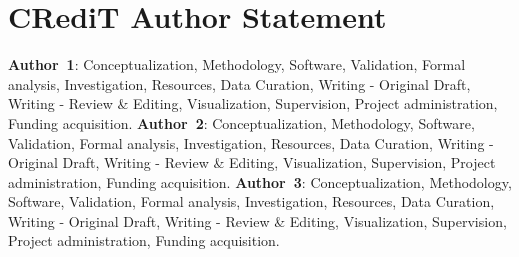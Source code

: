 \documentclass[../main.tex]{subfiles}
\begin{document}
    \clearpage
\section*{CRediT Author Statement}
    \label{section:credit-author}

\textbf{Author~1}: Conceptualization, Methodology, Software, Validation, Formal analysis, Investigation, Resources, Data Curation, Writing - Original Draft, Writing - Review \& Editing, Visualization, Supervision, Project administration, Funding acquisition.
\textbf{Author~2}: Conceptualization, Methodology, Software, Validation, Formal analysis, Investigation, Resources, Data Curation, Writing - Original Draft, Writing - Review \& Editing, Visualization, Supervision, Project administration, Funding acquisition.
\textbf{Author~3}: Conceptualization, Methodology, Software, Validation, Formal analysis, Investigation, Resources, Data Curation, Writing - Original Draft, Writing - Review \& Editing, Visualization, Supervision, Project administration, Funding acquisition.

    
    
\end{document}
